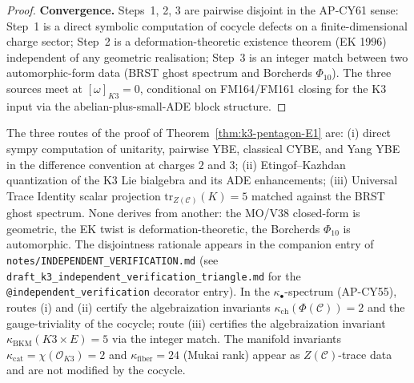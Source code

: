 \begin{proof}
\textbf{Convergence.}  Steps~1, 2, 3 are pairwise disjoint in the
AP-CY61 sense: Step~1 is a direct symbolic computation of cocycle
defects on a finite-dimensional charge sector; Step~2 is a
deformation-theoretic existence theorem
\textup{(}EK 1996\textup{)} independent of any geometric realisation;
Step~3 is an integer match between two automorphic-form data
\textup{(}BRST ghost spectrum and Borcherds $\Phi_{10}$\textup{)}.
The three sources meet at $[\omega]_{K3} = 0$, conditional on
FM164/FM161 closing for the K$3$ input via the abelian-plus-small-ADE
block structure.
\end{proof}

\begin{remark}
\label{rem:k3-pentagon-three-routes}
The three routes of the proof of Theorem~\ref{thm:k3-pentagon-E1} are:
\textup{(i)} direct sympy computation of unitarity, pairwise YBE,
classical CYBE, and Yang YBE in the difference convention at charges
$2$ and $3$; \textup{(ii)} Etingof--Kazhdan quantization of the K$3$
Lie bialgebra and its ADE enhancements; \textup{(iii)} Universal
Trace Identity scalar projection $\mathrm{tr}_{Z(\mathcal{C})}(K) = 5$
matched against the BRST ghost spectrum.  None derives from another:
the MO/V38 closed-form is geometric, the EK twist is
deformation-theoretic, the Borcherds $\Phi_{10}$ is automorphic.  The
disjointness rationale appears in the companion entry of
\texttt{notes/INDEPENDENT\_VERIFICATION.md} \textup{(}see
\texttt{draft\_k3\_independent\_verification\_triangle.md} for the
\texttt{@independent\_verification} decorator entry\textup{).}  In the
$\kappa_\bullet$-spectrum (AP-CY55), routes \textup{(i)} and
\textup{(ii)} certify the algebraization invariants
$\kappa_{\mathrm{ch}}(\Phi(\mathcal{C})) = 2$ and the
gauge-triviality of the cocycle; route \textup{(iii)} certifies the
algebraization invariant
$\kappa_{\mathrm{BKM}}(K3 \times E) = 5$ via the integer match.  The
manifold invariants $\kappa_{\mathrm{cat}} = \chi(\mathcal{O}_{K3}) = 2$
and $\kappa_{\mathrm{fiber}} = 24$ (Mukai rank) appear as
$Z(\mathcal{C})$-trace data and are not modified by the cocycle.
\end{remark}

